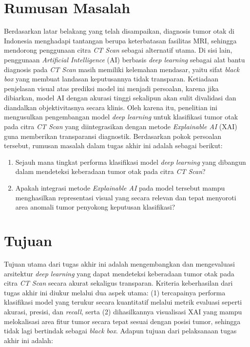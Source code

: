 \section{Rumusan Masalah}
Berdasarkan latar belakang yang telah disampaikan, diagnosis tumor otak di Indonesia menghadapi tantangan berupa keterbatasan fasilitas MRI, sehingga mendorong penggunaan citra \textit{CT Scan} sebagai alternatif utama. Di sisi lain, penggunaan \textit{Artificial Intelligence} (AI) berbasis \textit{deep learning} sebagai alat bantu diagnosis pada \textit{CT Scan} masih memiliki kelemahan mendasar, yaitu sifat \textit{black box} yang membuat landasan keputusannya tidak transparan. Ketiadaan penjelasan visual atas prediksi model ini menjadi persoalan, karena jika dibiarkan, model AI dengan akurasi tinggi sekalipun akan sulit divalidasi dan diandalkan objektivitasnya secara klinis. Oleh karena itu, penelitian ini mengusulkan pengembangan model \textit{deep learning} untuk klasifikasi tumor otak pada citra \textit{CT Scan} yang diintegrasikan dengan metode \textit{Explainable AI} (XAI) guna memberikan transparansi diagnostik. Berdasarkan pokok persoalan tersebut, rumusan masalah dalam tugas akhir ini adalah sebagai berikut:

\begin{enumerate}
	\item Sejauh mana tingkat performa klasifikasi model \textit{deep learning} yang dibangun dalam mendeteksi keberadaan tumor otak pada citra \textit{CT Scan}?
	
	\item Apakah integrasi metode \textit{Explainable AI} pada model tersebut mampu menghasilkan representasi visual yang secara relevan dan tepat menyoroti area anomali tumor penyokong keputusan klasifikasi?
\end{enumerate}


\section{Tujuan}
Tujuan utama dari tugas akhir ini adalah mengembangkan dan mengevaluasi arsitektur \textit{deep learning} yang dapat mendeteksi keberadaan tumor otak pada citra \textit{CT Scan} secara akurat sekaligus transparan. Kriteria keberhasilan dari tugas akhir ini diukur melalui dua aspek utama: (1) tercapainya performa klasifikasi model yang terukur secara kuantitatif melalui metrik evaluasi seperti akurasi, presisi, dan \textit{recall}, serta (2) dihasilkannya visualisasi XAI yang mampu melokalisasi area fitur tumor secara tepat sesuai dengan posisi tumor, sehingga tidak lagi bertindak sebagai \textit{black box}. Adapun tujuan dari pelaksanaan tugas akhir ini adalah:

